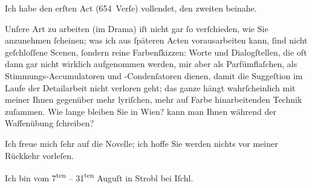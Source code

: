 \pstart
           Ich habe den erſten Act
               (654 Verſe) vollendet, den zweiten beinahe.\pend
           
\pstart
           Unſere Art zu arbeiten (im Drama) iſt nicht gar{ }ſo verſchieden, wie Sie anzunehmen{ }ſcheinen; was ich {\pb}aus{ }ſpäteren
               Acten vorausarbeiten kann,{ }ſind nicht geſchloſſene Scenen,{ }ſondern reine
               Farbenſkizzen: Worte und Dialogſtellen, die oft dann gar nicht wirklich aufgenommen
               werden, mir aber als Parfümflaſchen, als Stimmungs-Accumulatoren und -Condenſatoren
               dienen, damit die Suggeſtion im Laufe der Detailarbeit nicht verloren geht; das ganze
               hängt wahrſcheinlich mit meiner Ihnen gegenüber mehr lyriſchen, mehr auf Farbe
               hinarbeitenden Technik zuſammen. Wie lange {\pb}bleiben Sie in Wien? kann man Ihnen während der Waffenübung{ }ſchreiben?\pend
           
\pstart
           Ich freue mich{ }ſehr auf die Novelle; ich hoffe
               Sie werden nichts vor meiner Rückkehr vorleſen.\pend
           
\pstart
           Ich bin vom 7\textsuperscript{ten} – 31\textsuperscript{ten} Auguſt in Strobl bei Iſchl.\pend
           
